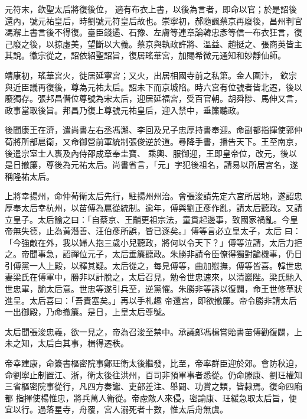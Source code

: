 \begin{pinyinscope}
 元符末，欽聖太后將復後位，
 適有布衣上書，以後為言者，即命以官；於是詔後還內，號元祐皇后，時劉號元符皇后故也。崇寧初，郝隨諷蔡京再廢後，昌州判官馮澥上書言後不得復。臺臣錢遹、石豫、左膚等連章論韓忠彥等信一布衣狂言，復己廢之後，以掠虛美，望斷以大義。蔡京與執政許將、溫益、趙挺之、張商英皆主其說。徽宗從之，詔依紹聖詔旨，復居瑤華宮，加賜希微元通知和妙靜仙師。



 靖康初，瑤華宮火，徙居延寧宮；又火，出居相國寺前之私第。金人圍汴，
 欽宗與近臣議再復後，尊為元祐太后。詔未下而京城陷。時六宮有位號者皆北遷，後以廢獨存。張邦昌僭位尊號為宋太后，迎居延福宮，受百官朝。胡舜陟、馬伸又言，政事當取後旨。邦昌乃復上尊號元祐皇后，迎入禁中，垂簾聽政。



 後聞康王在濟，遣尚書左右丞馮澥、李回及兄子忠厚持書奉迎。命副都指揮使郭仲荀將所部扈衛，又命御營前軍統制張俊逆於道。尋降手書，播告天下。王至南京，後遣宗室士人褭及內侍邵成章奉圭寶、
 乘輿、服御迎，王即皇帝位，改元，後以是日撤簾，尊後為元祐太后。尚書省言，「元」字犯後祖名，請易以所居宮名，遂稱隆祐太后。



 上將幸揚州，命仲荀衛太后先行，駐揚州州治。會張浚請先定六宮所居地，遂詔忠厚奉太后幸杭州，以苗傅為扈從統制。逾年，傅與劉正彥作亂，請太后聽政。又請立皇子。太后諭之曰：「自蔡京、王黼更祖宗法，童貫起邊事，致國家禍亂。今皇帝無失德，止為黃潛善、汪伯彥所誤，皆已逐矣。」傅等言必立皇太子，太后
 曰：「今強敵在外，我以婦人抱三歲小兒聽政，將何以令天下？」傅等泣請，太后力拒之。帝聞事急，詔禪位元子，太后垂簾聽政。朱勝非請令臣僚得獨對論機事，仍日引傅黨一人上殿，以釋其疑。太后從之，每見傅等，曲加慰撫，傅等皆喜。韓世忠妻梁氏在傅軍中，勝非以計脫之，太后召見，勉令世忠速來，以清巖陛。梁氏馳入世忠軍，諭太后意。世忠等遂引兵至，逆黨懼。朱勝非等誘以復闢，命王世修草狀進呈。太后喜曰：「吾責塞矣。」再以手札趣
 帝還宮，即欲撤簾。帝令勝非請太后一出御殿，乃命撤簾。是日，上皇太后尊號。



 太后聞張浚忠義，欲一見之，帝為召浚至禁中。承議郎馮楫嘗貽書苗傅勸復闢，上未之知，太后白其事，楫得遷秩。



 帝幸建康，命簽書樞密院事鄭玨衛太後繼發，比至，帝率群臣迎於郊。會防秋迫，命劉寧止制置江、浙，衛太後往洪州，百司非預軍事者悉從。仍命滕康、劉玨權知三省樞密院事從行，凡四方奏讞、吏部差注、舉闢、功賞之類，皆隸焉。復命四廂都
 指揮使楊惟忠，將兵萬人衛從。帝慮敵人來侵，密諭康、玨緩急取太后旨，便宜以行。過落星寺，舟覆，宮人溺死者十數，惟太后舟無虞。




\end{pinyinscope}
